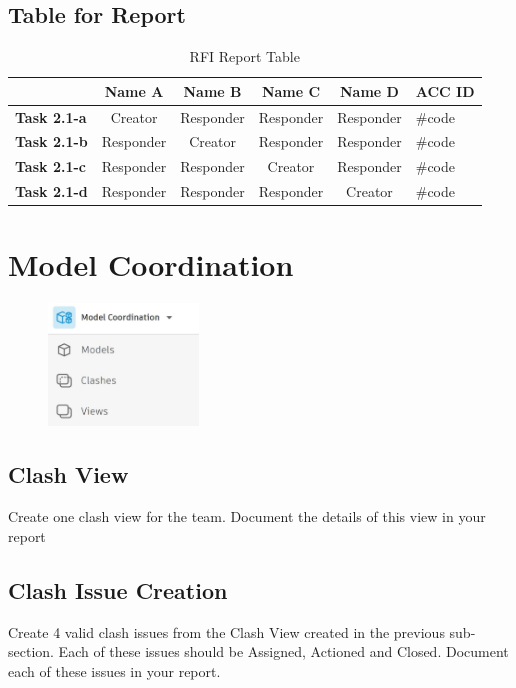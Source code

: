 \subsection{Table for Report}

\begin{table}[ht]
	\centering
	\begin{tabular}{|l|c|c|c|c|l|}
		\hline
		& \textbf{Name A} & \textbf{Name B} & \textbf{Name C} & \textbf{Name D} & \textbf{ACC ID}\\
		\hline
		\textbf{Task 2.1-a} & Creator & Responder & Responder & Responder & \#code\\
		\textbf{Task 2.1-b} & Responder & Creator & Responder & Responder & \#code\\
		\textbf{Task 2.1-c} & Responder & Responder & Creator & Responder & \#code\\
		\textbf{Task 2.1-d} & Responder & Responder & Responder & Creator & \#code\\
		\hline
	\end{tabular}
	\caption{RFI Report Table }
	\label{tab:rfi-items}
\end{table}





\newpage

\section{Model Coordination}
\begin{figure}[h!t]
	\includegraphics[width=4.0cm]{RevitAssets/modelcoord}
	\label{fig:modelmgmt}
\end{figure}


\subsection{Clash View}
Create one clash view for the team.  Document the details of this view in your report
\subsection{Clash Issue Creation}
Create 4 valid clash issues from the Clash View created in the previous sub-section.  Each of these issues should be Assigned, Actioned and Closed.  Document each of these issues in your report.

